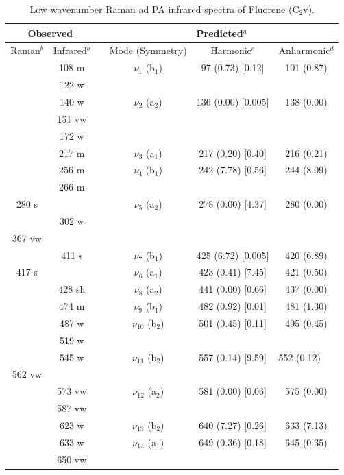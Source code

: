 \begin{table}[H]
	\caption{Low wavenumber Raman ad PA infrared spectra of Fluorene (C$_{2}$v).}
	\begin{center}
			\begin{tabular}{c c c c c c}
				\hline
				\multicolumn{ 2}{c}{Observed} & \multicolumn{1}{c}{} & \multicolumn{ 3}{c}{Predicted$^{a}$} \\ \hline
				Raman$^{b}$ & \multicolumn{1}{c}{Infrared$^{b}$} &  & \multicolumn{1}{c}{Mode (Symmetry)} & \multicolumn{1}{c}{Harmonic$^{c}$} & Anharmonic$^{d}$ \\ \hline
 & 108 m &  &$\nu_{1}$ (b$_{1}$) & 97 (0.73) [0.12] & 101 (0.87) \\ 
 & 122 w &  &  &  &  \\ 
 & 140 w &  &$\nu_{2}$ (a$_{2}$) & 136 (0.00) [0.005] & 138 (0.00) \\ 
 & 151 vw &  &  &  &  \\ 
 & 172 w &  &  &  &  \\ 
 & 217 m &  & $\nu_{3}$ (a$_{1}$) & 217 (0.20) [0.40] & 216 (0.21) \\ 
 & 256 m &  & $\nu_{4}$ (b$_{1}$) & 242 (7.78) [0.56] & 244 (8.09) \\ 
 & 266 m &  &  &  &  \\ 
 280 s &  &  & $\nu_{5}$ (a$_{2}$) & 278 (0.00) [4.37] & 280 (0.00) \\ 
 & 302 w &  &  &  &  \\ 
 367 vw &  &  &  &  &  \\ 
 & 411 s &  & $\nu_{7}$ (b$_{1}$) & 425 (6.72) [0.005] & 420 (6.89)  \\ 
 417 s &  &  & $\nu_{6}$ (a$_{1}$) & 423 (0.41) [7.45] & 421 (0.50) \\ 
 & 428 sh &  & $\nu_{8}$ (a$_{2}$) & 441 (0.00) [0.66] & 437 (0.00) \\ 
 & 474 m &  & $\nu_{9}$ (b$_{1}$) & 482 (0.92) [0.01] & 481 (1.30) \\ 
 & 487 w &  & $\nu_{10}$ (b$_{2}$) & 501 (0.45) [0.11] & 495 (0.45) \\ 
  & 519 w &  & \multicolumn{1}{c}{} &  &  \\ 
  & 545 w &  & $\nu_{11}$ (b$_{2}$) & 557 (0.14) [9.59] & \multicolumn{1}{l}{552 (0.12)} \\ 
  562 vw &  &  &  &  &  \\ 
  & 573 vw &  & $\nu_{12}$ (a$_{2}$) & 581 (0.00) [0.06] & 575 (0.00) \\ 
  & 587 vw &  &  &  &  \\ 
   & 623 w &  & $\nu_{13}$ (b$_{2}$) & 640 (7.27) [0.26] & 633 (7.13) \\ 
   & 633 w &  & $\nu_{14}$ (a$_{1}$)  & 649 (0.36) [0.18] & 645 (0.35) \\ 
   & 650 vw &  &  &  &  \\
 \bottomrule
\end{tabular}
\end{center}
\end{table}
 
